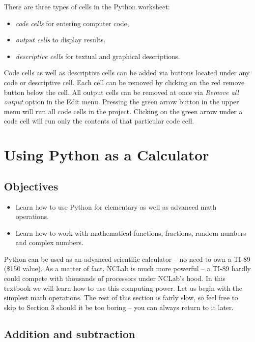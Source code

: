 \documentclass[article,A4,12pt]{llncs}
\begin{document}
There are three types of cells in the Python worksheet:
\begin{itemize}
\item {\em code cells} for entering computer code, 
\item {\em output cells} to display results, 
\item {\em descriptive cells} for textual and graphical descriptions.
\end{itemize} 
Code cells as well as descriptive cells can be added via buttons 
located under any code or descriptive cell. Each cell can be removed by clicking on the red 
remove button below the cell. All output cells can be removed at once via {\em Remove all output} 
option in the Edit menu. Pressing the green arrow button in the upper menu will run all code 
cells in the project. Clicking on the green arrow under a code cell will run only the contents 
of that particular code cell. 


\section{Using Python as a Calculator} \label{sec:calc}

\subsection{Objectives}

\begin{itemize}
\item Learn how to use Python for elementary as well as advanced math operations.
\item Learn how to work with mathematical functions, fractions, random numbers 
      and complex numbers.
\end{itemize}
Python can be used as an advanced scientific calculator -- no need to own a TI-89 (\$150 value). 
As a matter of fact, NCLab is much more powerful -- a TI-89 hardly could compete with thousands 
of processors under NCLab's hood. 
In this textbook we will learn how to use this computing power. Let us begin with the simplest math 
operations. The rest of this section is fairly slow, so feel free to skip to Section 3
should it be too boring -- you can always return to it later.

\subsection{Addition and subtraction}
\end{document}
